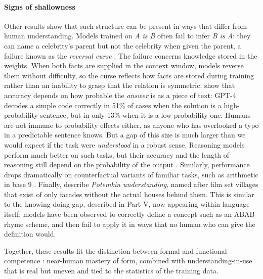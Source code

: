 \paragraph{Signs of shallowness}
Other results show that such structure can be present in ways that differ from human understanding. Models trained on {\em A is B} often fail to infer {\em B is A}: they can name a celebrity's parent but not the celebrity when given the parent, a failure known as the \emph{reversal curse} \citep{berglund2024reversalcurse}. The failure concerns knowledge stored in the weights. When both facts are supplied in the context window, models reverse them without difficulty, so the curse reflects how facts are stored during training rather than an inability to grasp that the relation is symmetric. \citet{mccoy2024embers} show that accuracy depends on how probable the \emph{answer} is as a piece of text: GPT-4 decodes a simple code correctly in 51\% of cases when the solution is a high-probability sentence, but in only 13\% when it is a low-probability one. Humans are not immune to probability effects either, as anyone who has overlooked a typo in a predictable sentence knows. But a gap of this size is much larger than we would expect if the task were \emph{understood} in a robust sense. Reasoning models perform much better on such tasks, but their accuracy and the length of reasoning still depend on the probability of the output \citep{mccoy2024o1}. Similarly, performance drops dramatically on counterfactual variants of familiar tasks, such as arithmetic in base 9 \citep{wu2024reasoning}. Finally, \citet{mancoridis2025potemkin} describe \emph{Potemkin understanding}, named after film set villages that exist of only facades without the actual houses behind them. This is similar to the knowing-doing gap, described in Part V, now appearing within language itself: models have been observed to correctly define a concept such as an ABAB rhyme scheme, and then fail to apply it in ways that no human who can give the definition would. 

Together, these results fit the distinction between formal and functional competence \citep{mahowald2023dissociating}: near-human mastery of form, combined with understanding-in-use that is real but uneven and tied to the statistics of the training data.

